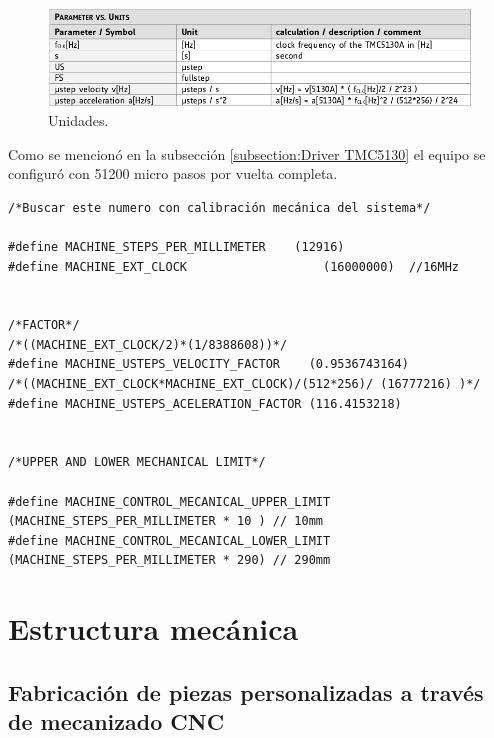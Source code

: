 \begin{figure}[h!]
	\centering
	\includegraphics[width=1\textwidth]{./Figures/unit.png}
	\caption{Unidades.}
	\label{fig:unidades}
\end{figure}


Como se mencionó en la subsección \ref{subsection:Driver TMC5130} el equipo se configuró con 51200 micro pasos por vuelta completa.  
 
 

\begin{lstlisting}[label=cod:vControl,caption=Macros de desplazamiento y factores de conversión.]  % Start your code-block
/*Buscar este numero con calibración mecánica del sistema*/

#define MACHINE_STEPS_PER_MILLIMETER	(12916)		
#define MACHINE_EXT_CLOCK					(16000000)	//16MHz


/*FACTOR*/
/*((MACHINE_EXT_CLOCK/2)*(1/8388608))*/	
#define MACHINE_USTEPS_VELOCITY_FACTOR	  (0.9536743164)
/*((MACHINE_EXT_CLOCK*MACHINE_EXT_CLOCK)/(512*256)/ (16777216) )*/
#define MACHINE_USTEPS_ACELERATION_FACTOR (116.4153218)


/*UPPER AND LOWER MECHANICAL LIMIT*/

#define MACHINE_CONTROL_MECANICAL_UPPER_LIMIT 	(MACHINE_STEPS_PER_MILLIMETER * 10 ) // 10mm
#define MACHINE_CONTROL_MECANICAL_LOWER_LIMIT	(MACHINE_STEPS_PER_MILLIMETER * 290) // 290mm

\end{lstlisting}







\section{Estructura mecánica}
\subsection{Fabricación de piezas personalizadas a través de mecanizado CNC}

